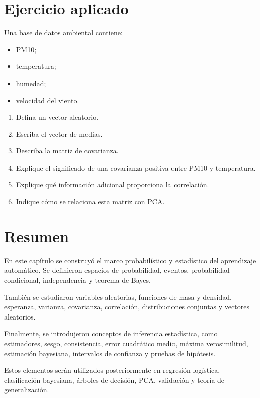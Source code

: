 \documentclass[
  spanish,
  11pt,
  letterpaper,
  DIV=11,
  numbers=noendperiod]{scrreprt}
\providecommand{\tightlist}{%
  \setlength{\itemsep}{0pt}\setlength{\parskip}{0pt}}
\theoremstyle{definition}
\theoremstyle{plain}
\theoremstyle{definition}
\theoremstyle{remark}
\begin{document}
\section{Ejercicio aplicado}\label{ejercicio-aplicado-1}

Una base de datos ambiental contiene:

\begin{itemize}
\tightlist
\item
  PM10;
\item
  temperatura;
\item
  humedad;
\item
  velocidad del viento.
\end{itemize}

\begin{enumerate}
\def\labelenumi{\arabic{enumi}.}
\tightlist
\item
  Defina un vector aleatorio.
\item
  Escriba el vector de medias.
\item
  Describa la matriz de covarianza.
\item
  Explique el significado de una covarianza positiva entre PM10 y
  temperatura.
\item
  Explique qué información adicional proporciona la correlación.
\item
  Indique cómo se relaciona esta matriz con PCA.
\end{enumerate}

\section{Resumen}\label{resumen-2}

En este capítulo se construyó el marco probabilístico y estadístico del
aprendizaje automático. Se definieron espacios de probabilidad, eventos,
probabilidad condicional, independencia y teorema de Bayes.

También se estudiaron variables aleatorias, funciones de masa y
densidad, esperanza, varianza, covarianza, correlación, distribuciones
conjuntas y vectores aleatorios.

Finalmente, se introdujeron conceptos de inferencia estadística, como
estimadores, sesgo, consistencia, error cuadrático medio, máxima
verosimilitud, estimación bayesiana, intervalos de confianza y pruebas
de hipótesis.

Estos elementos serán utilizados posteriormente en regresión logística,
clasificación bayesiana, árboles de decisión, PCA, validación y teoría
de generalización.
\end{document}
